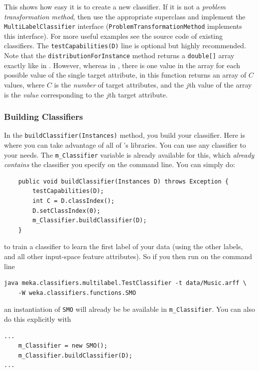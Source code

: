 \documentclass[11pt]{article}
\newcommand{\MEKA}{Meka}
\newcommand{\WEKA}{Weka}
\begin{document}
This shows how easy it is to create a new classifier. If it is not a \textit{problem transformation method},
then use the appropriate \framework{\WEKA} superclass and implement the \texttt{MultiLabelClassifier}
interface (\texttt{ProblemTransformationMethod} implements this interface).
For more useful examples see the source code of existing \framework{\MEKA} classifiers.
The \texttt{testCapabilities(D)} line is optional but highly recommended. Note that the \texttt{distributionForInstance}
method returns a \texttt{double[]} array exactly like in \framework{\WEKA}. However, whereas in \framework{\WEKA},
there is one value in the array for each possible value of the single target attribute, in \framework{\MEKA} this
function returns an array of $C$ values, where $C$ is the \emph{number} of target attributes, and the $j$th value of
the array is the \emph{value} corresponding to the $j$th target attribute.

\subsubsection{Building Classifiers}

In the \texttt{buildClassifier(Instances)} method, you build your classifier. Here is where you can take advantage of all of \framework{\WEKA}'s libraries. You can use any \framework{\WEKA} classifier to your needs. The \texttt{m\_Classifier} variable is already available for this, which \textit{already contains} the \framework{\WEKA} classifier you specify on the command line. You can simply do:
{
\lstset{basicstyle=\small\ttfamily,breaklines=true,language=java,frame=L,xleftmargin=\parindent}
\begin{lstlisting}
    public void buildClassifier(Instances D) throws Exception {
        testCapabilities(D);
        int C = D.classIndex();
        D.setClassIndex(0);
        m_Classifier.buildClassifier(D);
    }
\end{lstlisting}
}
to train a classifier to learn the first label of your data (using the other labels, and all other input-space feature attributes). So if you then run on the command line
{
\lstset{basicstyle=\small\ttfamily,breaklines=true,language=java,frame=L,xleftmargin=\parindent}
\begin{lstlisting}
java meka.classifiers.multilabel.TestClassifier -t data/Music.arff \
	-W weka.classifiers.functions.SMO
\end{lstlisting}
}
an instantiation of \texttt{SMO} will already be be available in \texttt{m\_Classifier}. You can also do this explicitly with
{
\lstset{basicstyle=\small\ttfamily,breaklines=true,language=java,frame=L,xleftmargin=\parindent}
\begin{lstlisting}
...
    m_Classifier = new SMO();
    m_Classifier.buildClassifier(D);
...
\end{lstlisting}
}
\end{document}
